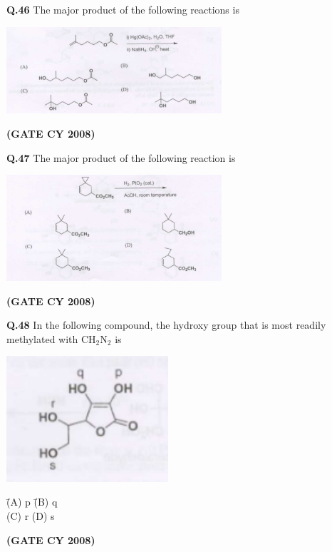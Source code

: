 \documentclass[12pt]{article}
\begin{document}
\begin{enumerate}
\vspace{0.5cm}

\textbf{Q.46} The major product of the following reactions is

\begin{center}
\includegraphics[width=0.6\textwidth]{figs/q46.png}
\end{center}   \textbf{(GATE CY 2008)}


\vspace{0.5cm}

\textbf{Q.47} The major product of the following reaction is

\begin{center}
\includegraphics[width=0.6\textwidth]{figs/q47.png}
\end{center}   \textbf{(GATE CY 2008)}


\vspace{0.5cm}

\textbf{Q.48} \quad In the following compound, the hydroxy group that is most readily methylated with CH$_2$N$_2$ is

\begin{center}
\includegraphics[width=0.45\textwidth]{figs/q48.png}
\end{center}

\begin{tabbing}
\hspace{1cm} \= (A) p \hspace{2cm} \= (B) q \\
\> (C) r \> (D) s
\end{tabbing}   \textbf{(GATE CY 2008)}



\end{enumerate}
\end{document}
